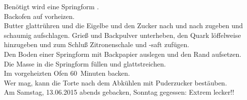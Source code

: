       \begin{zubereitung}
        Benötigt wird eine Springform \durchmesser{26 cm}. \\
	Backofen auf  vorheizen. \\
	Butter glattrühren und die Eigelbe und den Zucker nach und nach zugeben
	und schaumig aufschlagen. Grieß und Backpulver unterheben, den Quark
	löffelweise hinzugeben und zum Schluß Zitronenschale und -saft
	zufügen.\\
	Den Boden einer Springform mit Backpapier auslegen und den Rand
	aufsetzen. Die Masse in die Springform füllen und glattstreichen. \\
	Im vorgeheizten Ofen 60~Minuten backen. \\
	Wer mag, kann die Torte nach dem Abkühlen mit Puderzucker bestäuben. \\
	Am Samstag, 13.06.2015 abends gebacken, Sonntag gegessen: Extrem
	lecker!! \\
      \end{zubereitung}




